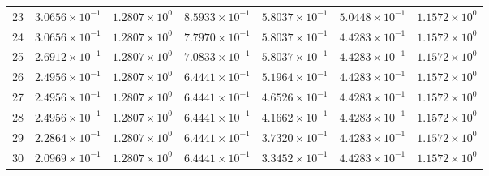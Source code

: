 \begin{table}[H]
\begin{tabular}{@{}rrrrrrr@{}}
23 & $3.0656\times10^{-1}$ & $1.2807\times10^{0}$ & $8.5933\times10^{-1}$ & $5.8037\times10^{-1}$ & $5.0448\times10^{-1}$ & $1.1572\times10^{0}$\\
24 & $3.0656\times10^{-1}$ & $1.2807\times10^{0}$ & $7.7970\times10^{-1}$ & $5.8037\times10^{-1}$ & $4.4283\times10^{-1}$ & $1.1572\times10^{0}$\\
25 & $2.6912\times10^{-1}$ & $1.2807\times10^{0}$ & $7.0833\times10^{-1}$ & $5.8037\times10^{-1}$ & $4.4283\times10^{-1}$ & $1.1572\times10^{0}$\\
26 & $2.4956\times10^{-1}$ & $1.2807\times10^{0}$ & $6.4441\times10^{-1}$ & $5.1964\times10^{-1}$ & $4.4283\times10^{-1}$ & $1.1572\times10^{0}$\\
27 & $2.4956\times10^{-1}$ & $1.2807\times10^{0}$ & $6.4441\times10^{-1}$ & $4.6526\times10^{-1}$ & $4.4283\times10^{-1}$ & $1.1572\times10^{0}$\\
28 & $2.4956\times10^{-1}$ & $1.2807\times10^{0}$ & $6.4441\times10^{-1}$ & $4.1662\times10^{-1}$ & $4.4283\times10^{-1}$ & $1.1572\times10^{0}$\\
29 & $2.2864\times10^{-1}$ & $1.2807\times10^{0}$ & $6.4441\times10^{-1}$ & $3.7320\times10^{-1}$ & $4.4283\times10^{-1}$ & $1.1572\times10^{0}$\\
30 & $2.0969\times10^{-1}$ & $1.2807\times10^{0}$ & $6.4441\times10^{-1}$ & $3.3452\times10^{-1}$ & $4.4283\times10^{-1}$ & $1.1572\times10^{0}$\\
\bottomrule
\end{tabular}
\end{table}

